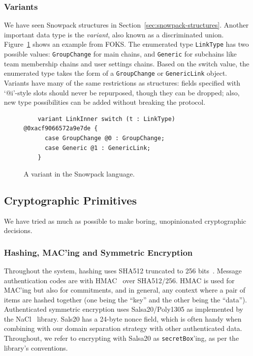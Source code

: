 \subsubsection{Variants}

We have seen Snowpack structures in Section~\ref{sec:snowpack-structures}. Another important
data type is the \textit{variant}, also known as a discriminated union. Figure~\ref{fig:link-inner}
shows an example from FOKS. The enumerated type \texttt{LinkType} has two possible values:
\texttt{GroupChange} for main chains, and \texttt{Generic} for subchains like team membership chains
and user settings chains. Based on the switch value, the enumerated type takes the form of 
a \texttt{GroupChange} or \texttt{GenericLink} object. Variants have many of the same restrictions
as structures: fields specified with `@i'-style slots should never be repurposed, though they 
can be dropped; also, new type possibilities can be added without breaking the protocol.

\begin{figure}[ht]
  \centering
  \begin{verbatim}
    variant LinkInner switch (t : LinkType) @0xacf9066572a9e7de {
      case GroupChange @0 : GroupChange;
      case Generic @1 : GenericLink;
    }\end{verbatim}
  \caption{A variant in the Snowpack language.}
  \label{fig:link-inner}
\end{figure}

\subsection{Cryptographic Primitives}
\label{sec:cryptography}

We have tried as much as possible to make boring, unopinionated cryptographic
decisions.

\subsubsection{Hashing, MAC'ing and Symmetric Encryption}

Throughout the system, hashing uses SHA512 truncated to 256 bits~\cite{rfc6234}.
Message authentication codes are with HMAC~\cite{rfc2104} over SHA512/256. HMAC
is used for MAC'ing but also for commitments, and in general, any context where
a pair of items are hashed together (one being the ``key'' and the other being
the ``data''). Authenticated symmetric encryption uses Salsa20/Poly1305 as
implemented by the NaCl~\cite{nacl} library. Sals20 has a 24-byte nonce field,
which is often handy when combining with our domain separation strategy with
other authenticated data. Throughout, we refer to encrypting with Salsa20 as
\texttt{secretBox}'ing, as per the library's conventions.


